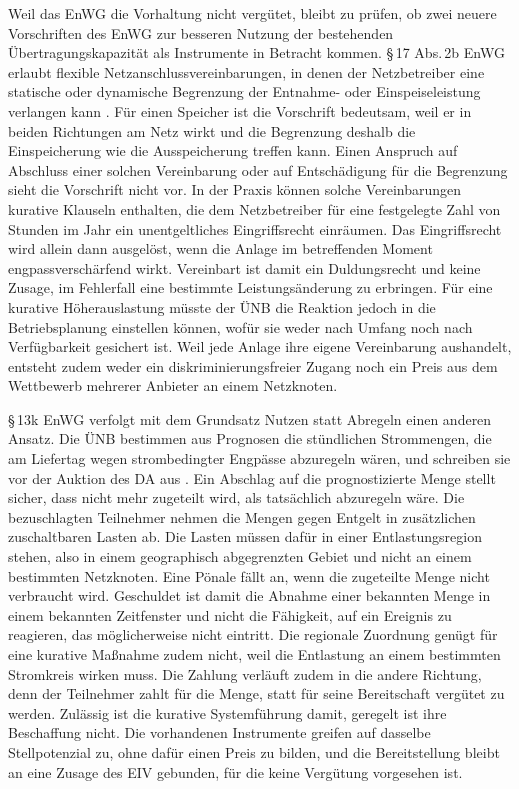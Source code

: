 \label{sec:flexible_connection}
Weil das \ac{EnWG} die Vorhaltung nicht vergütet, bleibt zu prüfen, ob zwei neuere Vorschriften des \ac{EnWG} zur besseren Nutzung der bestehenden Übertragungskapazität als Instrumente in Betracht kommen.
§\,17 Abs.\,2b \ac{EnWG} erlaubt flexible Netzanschlussvereinbarungen, in denen der Netzbetreiber eine statische oder dynamische Begrenzung der Entnahme- oder Einspeiseleistung verlangen kann \cite{bundesnetzagentur_faq_2025}.
Für einen Speicher ist die Vorschrift bedeutsam, weil er in beiden Richtungen am Netz wirkt und die Begrenzung deshalb die Einspeicherung wie die Ausspeicherung treffen kann.
Einen Anspruch auf Abschluss einer solchen Vereinbarung oder auf Entschädigung für die Begrenzung sieht die Vorschrift nicht vor.
In der Praxis können solche Vereinbarungen kurative Klauseln enthalten, die dem Netzbetreiber für eine festgelegte Zahl von Stunden im Jahr ein unentgeltliches Eingriffsrecht einräumen.
Das Eingriffsrecht wird allein dann ausgelöst, wenn die Anlage im betreffenden Moment engpassverschärfend wirkt.
Vereinbart ist damit ein Duldungsrecht und keine Zusage, im Fehlerfall eine bestimmte Leistungsänderung zu erbringen.
Für eine kurative Höherauslastung müsste der \ac{ÜNB} die Reaktion jedoch in die Betriebsplanung einstellen können, wofür sie weder nach Umfang noch nach Verfügbarkeit gesichert ist.
Weil jede Anlage ihre eigene Vereinbarung aushandelt, entsteht zudem weder ein diskriminierungsfreier Zugang noch ein Preis aus dem Wettbewerb mehrerer Anbieter an einem Netzknoten.

§\,13k \ac{EnWG} verfolgt mit dem Grundsatz \glqq{}Nutzen statt Abregeln\grqq{} einen anderen Ansatz.
Die \ac{ÜNB} bestimmen aus Prognosen die stündlichen Strommengen, die am Liefertag wegen strombedingter Engpässe abzuregeln wären, und schreiben sie vor der Auktion des \ac{DA} aus \cite{bundesministerium_der_justiz_energiewirtschaftsgesetz_2025}.
Ein Abschlag auf die prognostizierte Menge stellt sicher, dass nicht mehr zugeteilt wird, als tatsächlich abzuregeln wäre.
Die bezuschlagten Teilnehmer nehmen die Mengen gegen Entgelt in zusätzlichen zuschaltbaren Lasten ab.
Die Lasten müssen dafür in einer Entlastungsregion stehen, also in einem geographisch abgegrenzten Gebiet und nicht an einem bestimmten Netzknoten.
Eine Pönale fällt an, wenn die zugeteilte Menge nicht verbraucht wird.
Geschuldet ist damit die Abnahme einer bekannten Menge in einem bekannten Zeitfenster und nicht die Fähigkeit, auf ein Ereignis zu reagieren, das möglicherweise nicht eintritt.
Die regionale Zuordnung genügt für eine kurative Maßnahme zudem nicht, weil die Entlastung an einem bestimmten Stromkreis wirken muss.
Die Zahlung verläuft zudem in die andere Richtung, denn der Teilnehmer zahlt für die Menge, statt für seine Bereitschaft vergütet zu werden.
Zulässig ist die kurative Systemführung damit, geregelt ist ihre Beschaffung nicht.
Die vorhandenen Instrumente greifen auf dasselbe Stellpotenzial zu, ohne dafür einen Preis zu bilden, und die Bereitstellung bleibt an eine Zusage des \ac{EIV} gebunden, für die keine Vergütung vorgesehen ist.

